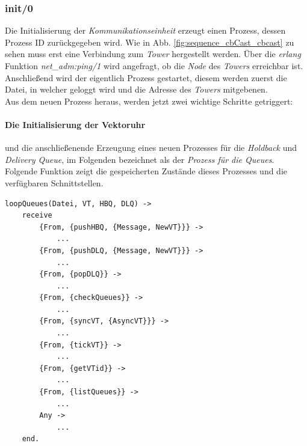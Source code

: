 \subsubsection{init/0} \label{cbcast_init_realisierung}

Die Initialisierung der \textit{Kommunikationseinheit} erzeugt einen Prozess, dessen Prozess ID zurückgegeben wird.
Wie in Abb. \ref{fig:sequence_cbCast_cbcast} zu sehen muss erst eine Verbindung zum \textit{Tower} hergestellt werden. Über die \textit{erlang} Funktion \textit{net\_adm:ping/1} wird angefragt, ob die \textit{Node} des \textit{Towers} erreichbar ist. Anschließend wird der eigentlich Prozess gestartet, diesem werden zuerst die Datei, in welcher geloggt wird und die Adresse des \textit{Towers} mitgebenen.\\Aus dem neuen Prozess heraus, werden jetzt zwei wichtige Schritte getriggert:

\paragraph{Die Initialisierung der Vektoruhr} und die anschließenende Erzeugung eines neuen Prozesses für die \textit{Holdback} und \textit{Delivery Queue}, im Folgenden bezeichnet als der \textit{Prozess für die Queues}. Folgende Funktion zeigt die gespeicherten Zustände dieses Prozesses und die verfügbaren Schnittstellen.

\begin{lstlisting}
loopQueues(Datei, VT, HBQ, DLQ) ->
    receive
        {From, {pushHBQ, {Message, NewVT}}} ->
            ...
        {From, {pushDLQ, {Message, NewVT}}} ->
            ...
        {From, {popDLQ}} ->
            ...
        {From, {checkQueues}} ->
            ...
        {From, {syncVT, {AsyncVT}}} ->
            ...
        {From, {tickVT}} -> 
            ...
        {From, {getVTid}} ->
            ...
        {From, {listQueues}} ->
            ...
        Any -> 
            ...
    end.
\end{lstlisting}

